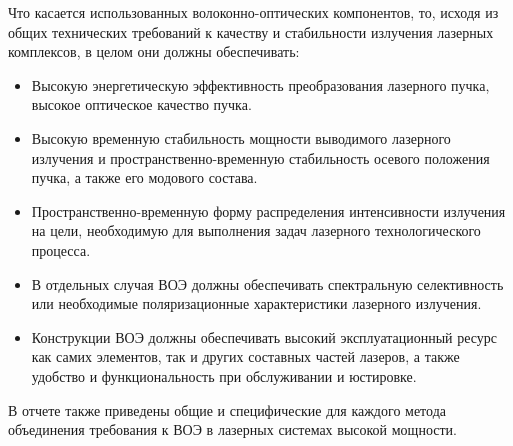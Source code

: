 Что касается использованных волоконно-оптических компонентов, то, исходя из общих технических требований к качеству и стабильности излучения лазерных комплексов, в целом они должны обеспечивать:
\begin{itemize}
    \item Высокую энергетическую эффективность преобразования лазерного пучка, высокое оптическое качество пучка.
    \item Высокую временную стабильность мощности выводимого лазерного излучения и пространственно-временную стабильность осевого положения пучка, а также его модового состава.
    \item Пространственно-временную форму распределения интенсивности излучения на цели, необходимую для выполнения задач лазерного технологического процесса.
    \item В отдельных случая ВОЭ должны обеспечивать спектральную селективность или необходимые поляризационные характеристики лазерного излучения.
    \item Конструкции ВОЭ должны обеспечивать высокий эксплуатационный ресурс как самих элементов, так и других составных частей лазеров, а также удобство и функциональность при обслуживании и юстировке.
\end{itemize}
В отчете также приведены общие и специфические для каждого метода объединения требования к ВОЭ в лазерных системах высокой мощности.

